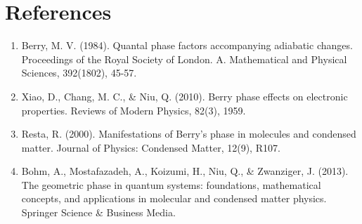 \documentclass{article}
\begin{document}
\section{References}

\begin{enumerate}
    \item Berry, M. V. (1984). Quantal phase factors accompanying adiabatic changes. Proceedings of the Royal Society of London. A. Mathematical and Physical Sciences, 392(1802), 45-57.
    \item Xiao, D., Chang, M. C., \& Niu, Q. (2010). Berry phase effects on electronic properties. Reviews of Modern Physics, 82(3), 1959.
    \item Resta, R. (2000). Manifestations of Berry's phase in molecules and condensed matter. Journal of Physics: Condensed Matter, 12(9), R107.
    \item Bohm, A., Mostafazadeh, A., Koizumi, H., Niu, Q., \& Zwanziger, J. (2013). The geometric phase in quantum systems: foundations, mathematical concepts, and applications in molecular and condensed matter physics. Springer Science \& Business Media.
\end{enumerate}
\end{document}
